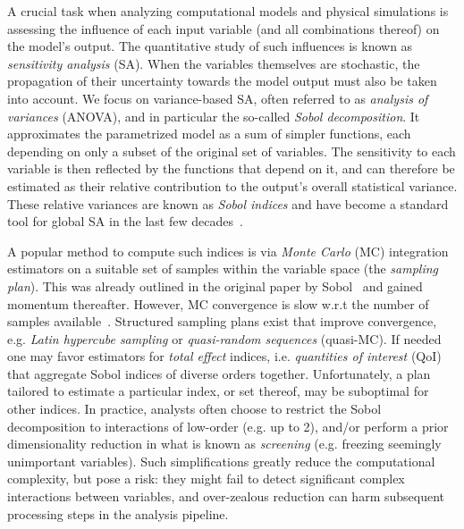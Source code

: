 \documentclass[review, twocolumn]{svjour3}          %
\begin{document}
A crucial task when analyzing computational models and physical simulations is assessing the influence of each input variable (and all combinations thereof) on the model's output. The quantitative study of such influences is known as \emph{sensitivity analysis} (SA). When the variables themselves are stochastic, the propagation of their uncertainty towards the model output must also be taken into account. We focus on variance-based SA, often referred to as \emph{analysis of variances} (ANOVA), and in particular the so-called \emph{Sobol decomposition}. It approximates the parametrized model as a sum of simpler functions, each depending on only a subset of the original set of variables. The sensitivity to each variable is then reflected by the functions that depend on it, and can therefore be estimated as their relative contribution to the output's overall statistical variance. These relative variances are known as \emph{Sobol indices} and have become a standard tool for global SA in the last few decades~\cite{SRACCGST:08, Sudret:08, MILR:09, ODC:14, IL:15}.

A popular method to compute such indices is via \emph{Monte Carlo} (MC) integration estimators on a suitable set of samples within the variable space (the \emph{sampling plan}). This was already outlined in the original paper by Sobol~\cite{Sobol:90} and gained momentum thereafter. However, MC convergence is slow w.r.t the number of samples available~\cite{IL:15}. Structured sampling plans exist that improve convergence, e.g. \emph{Latin hypercube sampling} or \emph{quasi-random sequences} (quasi-MC). If needed one may favor estimators for \emph{total effect} indices, i.e. \emph{quantities of interest} (QoI) that aggregate Sobol indices of diverse orders together. Unfortunately, a plan tailored to estimate a particular index, or set thereof, may be suboptimal for other indices. In practice, analysts often choose to restrict the Sobol decomposition to interactions of low-order (e.g. up to 2), and/or perform a prior dimensionality reduction in what is known as \emph{screening} (e.g. freezing seemingly unimportant variables). Such simplifications greatly reduce the computational complexity, but pose a risk: they might fail to detect significant complex interactions between variables, and over-zealous reduction can harm subsequent processing steps in the analysis pipeline.
\end{document}
